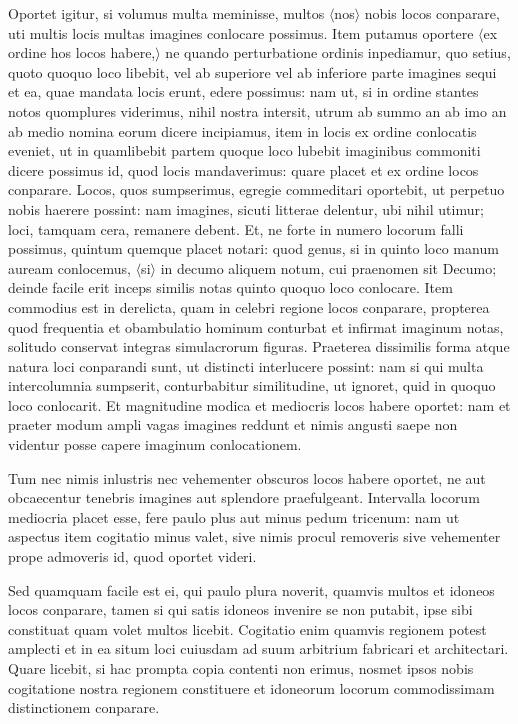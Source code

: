 Oportet igitur, si volumus multa meminisse, multos $\langle$nos$\rangle$ nobis locos conparare, uti multis locis multas imagines conlocare possimus. Item putamus oportere $\langle$ex ordine hos locos habere,$\rangle$ ne quando perturbatione ordinis inpediamur, quo setius, quoto quoquo loco libebit, vel ab superiore vel ab inferiore parte imagines sequi et ea, quae mandata locis erunt, edere possimus: nam ut, si in ordine stantes notos quomplures viderimus, nihil nostra intersit, utrum ab summo an ab imo an ab medio nomina eorum dicere incipiamus, item in locis ex ordine conlocatis eveniet, ut in quamlibebit partem quoque loco lubebit imaginibus commoniti dicere possimus id, quod locis mandaverimus: quare placet et ex ordine locos conparare. Locos, quos sumpserimus, egregie commeditari oportebit, ut perpetuo nobis haerere possint: nam imagines, sicuti litterae delentur, ubi nihil utimur; loci, tamquam cera, remanere debent. Et, ne forte in numero locorum falli possimus, quintum quemque placet notari: quod genus, si in quinto loco manum auream conlocemus, $\langle$si$\rangle$ in decumo aliquem notum, cui praenomen sit Decumo; deinde facile erit inceps similis notas quinto quoquo loco conlocare. Item commodius est in derelicta, quam in celebri regione locos conparare, propterea quod frequentia et obambulatio hominum conturbat et infirmat imaginum notas, solitudo conservat integras simulacrorum figuras. Praeterea dissimilis forma atque natura loci conparandi sunt, ut distincti interlucere possint: nam si qui multa intercolumnia sumpserit, conturbabitur similitudine, ut ignoret, quid in quoquo loco conlocarit. Et magnitudine modica et mediocris locos habere oportet: nam et praeter modum ampli vagas imagines reddunt et nimis angusti saepe non videntur posse capere imaginum conlocationem.

Tum nec nimis inlustris nec vehementer obscuros locos habere oportet, ne aut obcaecentur tenebris imagines aut splendore praefulgeant. Intervalla locorum mediocria placet esse, fere paulo plus aut minus pedum tricenum: nam ut aspectus item cogitatio minus valet, sive nimis procul removeris sive vehementer prope admoveris id, quod oportet videri.

Sed quamquam facile est ei, qui paulo plura noverit, quamvis multos et idoneos locos conparare, tamen si qui satis idoneos invenire se non putabit, ipse sibi constituat quam volet multos licebit. Cogitatio enim quamvis regionem potest amplecti et in ea situm loci cuiusdam ad suum arbitrium fabricari et architectari. Quare licebit, si hac prompta copia contenti non erimus, nosmet ipsos nobis cogitatione nostra regionem constituere et idoneorum locorum commodissimam distinctionem conparare. 

